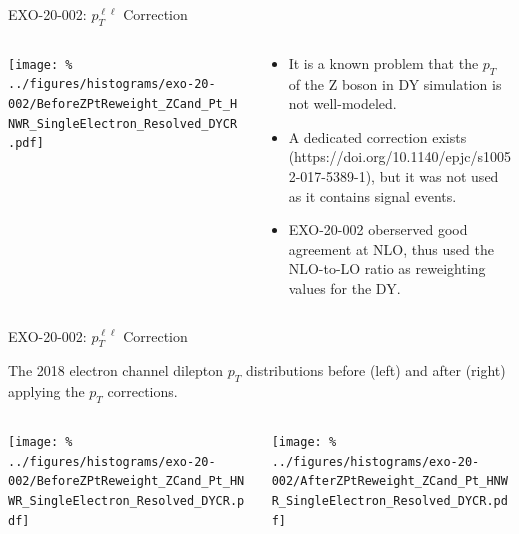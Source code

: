 \documentclass[aspectratio=169]{beamer}
\begin{document}
\begin{frame}{EXO-20-002: $p_T^{\ell \ell}$ Correction}
  \begin{columns}
    \begin{column}{0.45\textwidth}
      \texttt{[image: \%
        ../figures/histograms/exo-20-002/BeforeZPtReweight\_ZCand\_Pt\_HNWR\_SingleElectron\_Resolved\_DYCR.pdf]}
    \end{column}
    \begin{column}{0.5\textwidth}
      \begin{block}{}
        \begin{itemize}
          \item It is a known problem that the $p_T$ of the Z boson in DY simulation is not well-modeled.
          \item A dedicated correction exists (https://doi.org/10.1140/epjc/s10052-017-5389-1), but it was not used as it contains signal events.
          \item EXO-20-002 oberserved good agreement at NLO, thus used the NLO-to-LO ratio as reweighting values for the DY.
        \end{itemize}
      \end{block}
    \end{column}
  \end{columns}
\end{frame}

\begin{frame}{EXO-20-002: $p_T^{\ell \ell}$ Correction}
  \begin{block}{}
    The 2018 electron channel dilepton $p_T$ distributions before (left) and after (right) applying the $p_T$ corrections.
  \end{block}
  \vfill
  \begin{columns}
    \begin{column}{0.45\textwidth}
      \texttt{[image: \%
        ../figures/histograms/exo-20-002/BeforeZPtReweight\_ZCand\_Pt\_HNWR\_SingleElectron\_Resolved\_DYCR.pdf]}
    \end{column}
    \begin{column}{0.45\textwidth}
      \texttt{[image: \%
        ../figures/histograms/exo-20-002/AfterZPtReweight\_ZCand\_Pt\_HNWR\_SingleElectron\_Resolved\_DYCR.pdf]}
    \end{column}
  \end{columns}
\end{frame}
\end{document}
